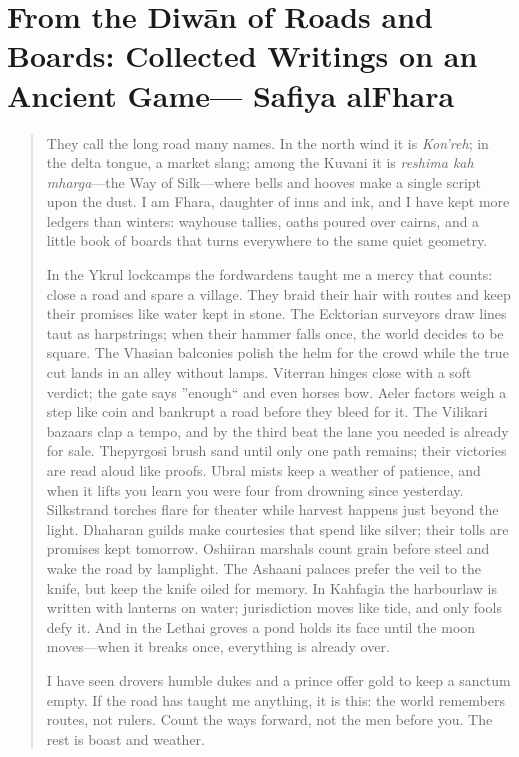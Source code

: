 \documentclass[11pt]{article}
\begin{document}
\normalsize

\clearpage


\section{From the Diwān of Roads and Boards: Collected Writings on an Ancient Game--- Safiya al\textendash Fhara}
\begin{quote}\small
They call the long road many names. In the north wind it is \emph{Kon'reh}; in the delta tongue, a market slang; among the Kuvani it is \emph{reshima kah mharga}---the Way of Silk---where bells and hooves make a single script upon the dust. I am Fhara, daughter of inns and ink, and I have kept more ledgers than winters: way\textendash house tallies, oaths poured over cairns, and a little book of boards that turns everywhere to the same quiet geometry.

In the Ykrul lock\textendash camps the ford\textendash wardens taught me a mercy that counts: close a road and spare a village. They braid their hair with routes and keep their promises like water kept in stone. The Ecktorian surveyors draw lines taut as harp\textendash strings; when their hammer falls once, the world decides to be square. The Vhasian balconies polish the helm for the crowd while the true cut lands in an alley without lamps. Viterran hinges close with a soft verdict; the gate says ''enough`` and even horses bow. Aeler factors weigh a step like coin and bankrupt a road before they bleed for it. The Vilikari bazaars clap a tempo, and by the third beat the lane you needed is already for sale. Thepyrgosi brush sand until only one path remains; their victories are read aloud like proofs. Ubral mists keep a weather of patience, and when it lifts you learn you were four from drowning since yesterday. Silkstrand torches flare for theater while harvest happens just beyond the light. Dhaharan guilds make courtesies that spend like silver; their tolls are promises kept tomorrow. Oshiiran marshals count grain before steel and wake the road by lamp\textendash light. The Ashaani palaces prefer the veil to the knife, but keep the knife oiled for memory. In Kahfagia the harbour\textendash law is written with lanterns on water; jurisdiction moves like tide, and only fools defy it. And in the Lethai groves a pond holds its face until the moon moves---when it breaks once, everything is already over.

I have seen drovers humble dukes and a prince offer gold to keep a sanctum empty. If the road has taught me anything, it is this: the world remembers routes, not rulers. Count the ways forward, not the men before you. The rest is boast and weather.
\end{quote}
\end{document}
